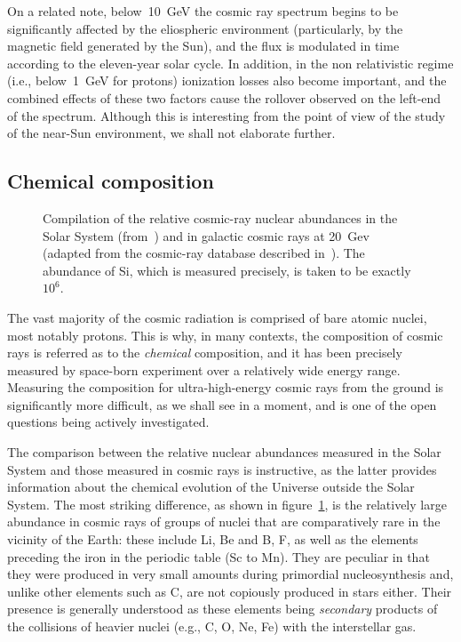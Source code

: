 On a related note, below~10~GeV the cosmic ray spectrum begins to be significantly
affected by the eliospheric environment (particularly, by the magnetic field generated
by the Sun), and the flux is modulated in time according to the eleven-year solar
cycle. In addition, in the non relativistic regime (i.e., below~1~GeV for protons)
ionization losses also become important, and the combined effects of these two
factors cause the rollover observed on the left-end of the spectrum. Although this
is interesting from the point of view of the study of the near-Sun environment,
we shall not elaborate further.


\subsection{Chemical composition}
\label{sec:cr_composition}

\begin{figure}[!htbp]
  
  \caption{Compilation of the relative cosmic-ray nuclear abundances in the Solar System
    (from~\cite{2003ApJ...591.1220L}) and in galactic cosmic rays at 20~Gev (adapted from
    the cosmic-ray database described in~\cite{2023EPJC...83..971}). The abundance
    of Si, which is measured precisely, is taken to be exactly $10^6$.}
  \label{fig:cr_composition}
\end{figure}

The vast majority of the cosmic radiation is comprised of bare atomic nuclei,
most notably protons. This is why, in many contexts, the composition of cosmic
rays is referred as to the \emph{chemical} composition, and it has been precisely
measured by space-born experiment over a relatively wide energy
range. Measuring the composition for ultra-high-energy cosmic rays from the ground
is significantly more difficult, as we shall see in a moment, and is one of the open
questions being actively investigated.

The comparison between the relative nuclear abundances measured in the Solar
System and
those measured in cosmic rays is instructive, as the latter provides information
about the chemical evolution of the Universe outside the Solar System.
The most striking difference, as shown in figure~\ref{fig:cr_composition}, is the
relatively large abundance in cosmic rays of groups of nuclei that are comparatively
rare in the vicinity of the Earth: these include Li, Be and B, F, as well as the
elements preceding the iron in the periodic table (Sc to Mn). They are peculiar in that
they were produced in very small amounts during primordial nucleosynthesis and, unlike
other elements such as C, are not copiously produced in stars either.
Their presence is generally understood as these elements being \emph{secondary} products
of the collisions of heavier nuclei (e.g., C, O, Ne, Fe) with the interstellar gas.

